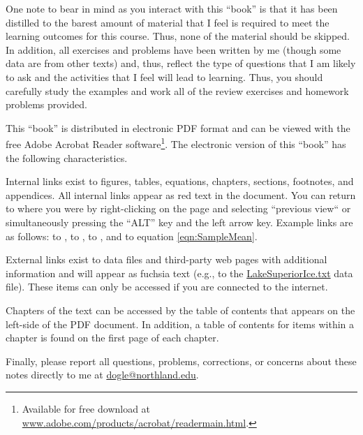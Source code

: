 One note to bear in mind as you interact with this ``book'' is that it has been distilled to the barest amount of material that I feel is required to meet the learning outcomes for this course.  Thus, none of the material should be skipped.  In addition, all exercises and problems have been written by me (though some data are from other texts) and, thus, reflect the type of questions that I am likely to ask and the activities that I feel will lead to learning.  Thus, you should carefully study the examples and work all of the review exercises and homework problems provided.

This ``book'' is distributed in electronic PDF format and can be viewed with the free Adobe Acrobat Reader software\footnote{Available for free download at \href{http://www.adobe.com/products/acrobat/readermain.html}{www.adobe.com/products/acrobat/readermain.html}.}.  The electronic version of this ``book'' has the following characteristics.

\begin{Itemize}
  \item Internal links exist to figures, tables, equations, chapters, sections, footnotes, and appendices.  All internal links appear as red text in the document.  You can return to where you were by right-clicking on the page and selecting ``previous view`` or simultaneously pressing the ``ALT'' key and the left arrow key.  Example links are as follows: to , to , to , and to equation \eqref{eqn:SampleMean}.
  \item External links exist to data files and third-party web pages with additional information and will appear as fuchsia text (e.g., to the \href{https://sites.google.com/site/ncstats/data/LakeSuperiorIce.txt}{LakeSuperiorIce.txt} data file).  These items can only be accessed if you are connected to the internet.
  \item Chapters of the text can be accessed by the table of contents that appears on the left-side of the PDF document.  In addition, a table of contents for items within a chapter is found on the first page of each chapter.
\end{Itemize}

Finally, please report all questions, problems, corrections, or concerns about these notes directly to me at \href{mailto:dogle@northland.edu}{dogle@northland.edu}.


